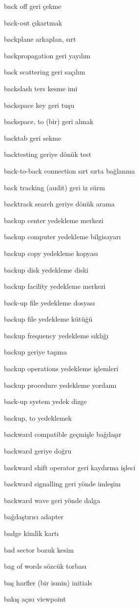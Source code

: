 \documentclass[12pt,fleqn]{article}\usepackage{../../common}
\begin{document}
back off geri çekme

back-out çıkartmak

backplane arkaplan, sırt

backpropagation geri yayılım

back scattering geri saçılım

backslash ters kesme imi

backspace key geri tuşu

backspace, to (bir) geri almak

backtab geri sekme

backtesting geriye dönük test

back-to-back connection sırt sırta bağlanma

back tracking (audit) geri iz sürm

backtrack search geriye dönük arama

backup center yedekleme merkezi

backup computer yedekleme bilgisayarı

backup copy yedekleme kopyası

backup disk yedekleme diski

backup facility yedekleme merkezi

back-up file yedekleme dosyası

backup file yedekleme kütüğü

backup frequency yedekleme sıklığı

backup geriye taşıma

backup operations yedekleme işlemleri

backup procedure yedekleme yordamı

back-up system yedek dizge

backup, to yedeklemek

backward compatible geçmişle bağdaşır

backward geriye doğru

backward shift operator geri kaydırma işleci

backward signalling geri yönde imleşim

backward wave geri yönde dalga

bağdaştırıcı adapter

badge kimlik kartı

bad sector bozuk kesim

bag of words sözcük torbası

baş harfler (bir ismin) initials

bakış açısı viewpoint
\end{document}
